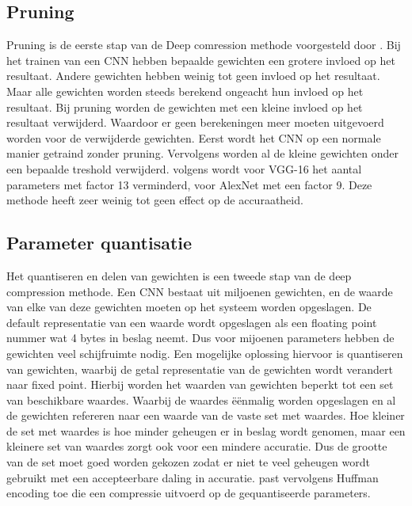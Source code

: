 
\subsection{Pruning}
Pruning is de eerste stap van de Deep comression methode voorgesteld door \cite{han_deep_2016}.
Bij het trainen van een CNN hebben bepaalde gewichten een grotere invloed op het resultaat.
Andere gewichten hebben weinig tot geen invloed op het resultaat.
Maar alle gewichten worden steeds berekend ongeacht hun invloed op het resultaat.
Bij pruning worden de gewichten met een kleine invloed op het resultaat verwijderd. 
Waardoor er geen berekeningen meer moeten uitgevoerd worden voor de verwijderde gewichten.
Eerst wordt het CNN op een normale manier getraind zonder pruning.
Vervolgens worden al de kleine gewichten onder een bepaalde treshold verwijderd.
volgens \cite{han_deep_2016} wordt voor VGG-16 het aantal parameters met factor 13 verminderd, voor AlexNet met een factor 9.
Deze methode heeft zeer weinig tot geen effect op de accuraatheid.

\subsection{Parameter quantisatie}
Het quantiseren en delen van gewichten is een tweede stap van de deep compression methode.
Een CNN bestaat uit miljoenen gewichten, en de waarde van elke van deze gewichten moeten op het systeem worden opgeslagen.
De default representatie van een waarde wordt opgeslagen als een floating point nummer wat 4 bytes in beslag neemt.
Dus voor mijoenen parameters hebben de gewichten veel schijfruimte nodig.
Een mogelijke oplossing hiervoor is quantiseren van gewichten, waarbij de getal representatie van de gewichten wordt verandert naar fixed point.
Hierbij worden het waarden van gewichten beperkt tot een set van beschikbare waardes.
Waarbij de waardes \"e\"enmalig worden opgeslagen en al de gewichten refereren naar een waarde van de vaste set met waardes.
Hoe kleiner de set met waardes is hoe minder geheugen er in beslag wordt genomen, maar een kleinere set van waardes zorgt ook voor een mindere accuratie.
Dus de grootte van de set moet goed worden gekozen zodat er niet te veel geheugen wordt gebruikt met een accepteerbare daling in accuratie.
\cite{han_deep_2016} past vervolgens Huffman encoding toe die een compressie uitvoerd op de gequantiseerde parameters.

